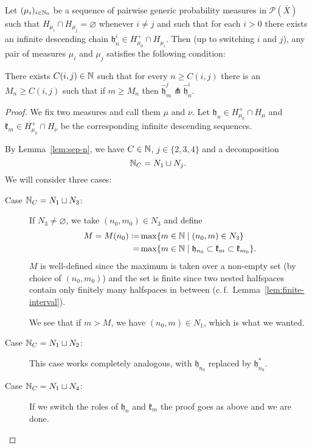 \begin{lemma}[{\cite[Lemma~4.13]{MR3509968}}]
  \label{lem:4.13}
  Let \((\mu_i)_{i \in \mathbb{N}_0}\) be a sequence of pairwise generic probability measures in \(\mathcal{P}(\bar X)\) such that \(H_{\mu_i} \cap H_{\mu_j} = \varnothing\) whenever \(i \neq j\) and such that for each \(i > 0\) there exists an infinite descending chain \(\mathfrak{h}_n^i \in H_{\mu_0}^+ \cap H_{\mu_i}\). Then (up to switching \(i\) and \(j\)), any pair of measures \(\mu_i\) and \(\mu_j\) satisfies the following condition:

  There exists \(C(i,j) \in \mathbb{N}\) such that for every \(n \geq C(i,j)\) there is an \(M_n \geq C(i,j)\) such that if \(m \geq M_n\) then \(\mathfrak{\hat h}^j_m \pitchfork \mathfrak{\hat h}^i_n\). 
\end{lemma}

\begin{proof}
  We fix two measures and call them \(\mu\) and \(\nu\). Let \(\mathfrak{h}_n \in H_{\mu_0}^+ \cap H_\mu\) and \(\mathfrak{k}_m \in H_{\mu_0}^+ \cap H_\nu\) be the corresponding infinite descending sequences.
  
  By Lemma~\ref{lem:sep-n}, we have \(C \in \mathbb{N}\), \(j \in \{2,3,4\}\) and a decomposition
  \[
    \mathbb{N}_C = N_1 \sqcup N_j.
  \]
  We will consider three cases:
  \begin{description}
  \item[Case \(\mathbb{N}_C = N_1 \sqcup N_3\):] If \(N_3 \neq \varnothing\), we take \((n_0, m_0) \in N_3\) and define
    \begin{align*}
      M = M(n_0)  \coloneqq & \max \{m \in \mathbb{N} \mid (n_0, m) \in N_3\}\\
                      = & \max \{m \in \mathbb{N} \mid \mathfrak{h}_{n_0} \subset \mathfrak{k}_m \subset \mathfrak{k}_{m_0}\}.
    \end{align*}
    \(M\) is well-defined since the maximum is taken over a non-empty set (by choice of \((n_0, m_0)\)) and the set is finite since two nested halfspaces contain only finitely many halfspaces in between (c.\,f.\ Lemma~\ref{lem:finite-interval}).

    We see that if \(m > M\), we have \((n_0, m) \in N_1\), which is what we wanted.
  \item[Case \(\mathbb{N}_C = N_1 \sqcup N_2\):] This case works completely analogous, with \(\mathfrak{h}_{n_0}\) replaced by \(\mathfrak{h}_{n_0}^\ast\).
  \item[Case \(\mathbb{N}_C = N_1 \sqcup N_4\):] If we switch the roles of \(\mathfrak{h}_n\) and \(\mathfrak{k}_m\) the proof goes as above and we are done.
  \end{description}
\end{proof}

